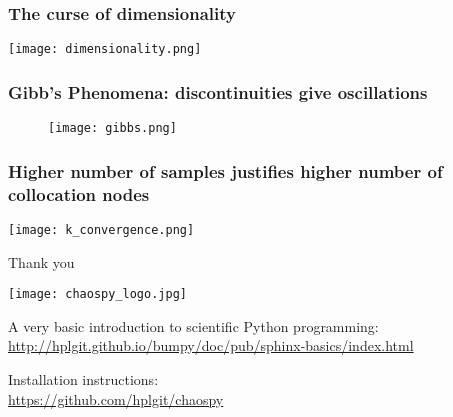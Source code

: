 \documentclass[handout]{beamer}
\begin{document}
\begin{frame}
  \frametitle{The curse of dimensionality}
  \texttt{[image: dimensionality.png]}

\end{frame}


\begin{frame}
  \frametitle{Gibb's Phenomena: discontinuities give oscillations}
  \begin{figure}
  \texttt{[image: gibbs.png]}
  \end{figure}
  \end{frame}

\begin{frame}
 \frametitle{Higher number of samples justifies higher number of
 collocation nodes}
\texttt{[image: k\_convergence.png]}
 \end{frame}

 
 
\begin{frame}[fragile]{Thank you}
  \begin{center}
     \texttt{[image: chaospy\_logo.jpg]}
  \end{center}
    \begin{alert}{A very basic introduction to scientific Python programming:}
    \scriptsize
      \href{http://hplgit.github.io/bumpy/doc/pub/sphinx-basics/index.html}{http://hplgit.github.io/bumpy/doc/pub/sphinx-basics/index.html}\\
  \end{alert}
  \begin{alert}{Installation instructions:}\\
  \scriptsize
      \href{https://github.com/hplgit/chaospy}{https://github.com/hplgit/chaospy}\\
  \end{alert}
% 
\end{frame}
 


\end{document}
